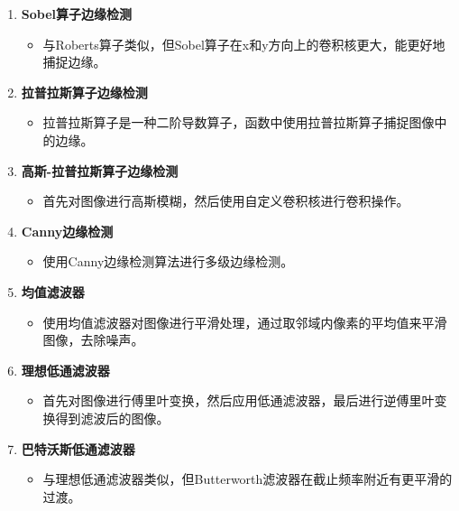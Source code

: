 \documentclass[UTF8,openany]{ctexbook}
\begin{document}
\begin{enumerate}[label=\arabic*., leftmargin=*]
  \item \textbf{Sobel算子边缘检测}
    \begin{itemize}[label=--, leftmargin=*]
      \item 与Roberts算子类似，但Sobel算子在x和y方向上的卷积核更大，能更好地捕捉边缘。
    \end{itemize}
  
  \item \textbf{拉普拉斯算子边缘检测}
    \begin{itemize}[label=--, leftmargin=*]
      \item 拉普拉斯算子是一种二阶导数算子，函数中使用拉普拉斯算子捕捉图像中的边缘。
    \end{itemize}
  
  \item \textbf{高斯-拉普拉斯算子边缘检测}
    \begin{itemize}[label=--, leftmargin=*]
      \item 首先对图像进行高斯模糊，然后使用自定义卷积核进行卷积操作。
    \end{itemize}
  
  \item \textbf{Canny边缘检测}
    \begin{itemize}[label=--, leftmargin=*]
      \item 使用Canny边缘检测算法进行多级边缘检测。
    \end{itemize}
  
  \item \textbf{均值滤波器}
    \begin{itemize}[label=--, leftmargin=*]
      \item 使用均值滤波器对图像进行平滑处理，通过取邻域内像素的平均值来平滑图像，去除噪声。
    \end{itemize}
  
  \item \textbf{理想低通滤波器}
    \begin{itemize}[label=--, leftmargin=*]
      \item 首先对图像进行傅里叶变换，然后应用低通滤波器，最后进行逆傅里叶变换得到滤波后的图像。
    \end{itemize}
  
  \item \textbf{巴特沃斯低通滤波器}
    \begin{itemize}[label=--, leftmargin=*]
      \item 与理想低通滤波器类似，但Butterworth滤波器在截止频率附近有更平滑的过渡。
    \end{itemize}
  

\end{enumerate}
\end{document}
